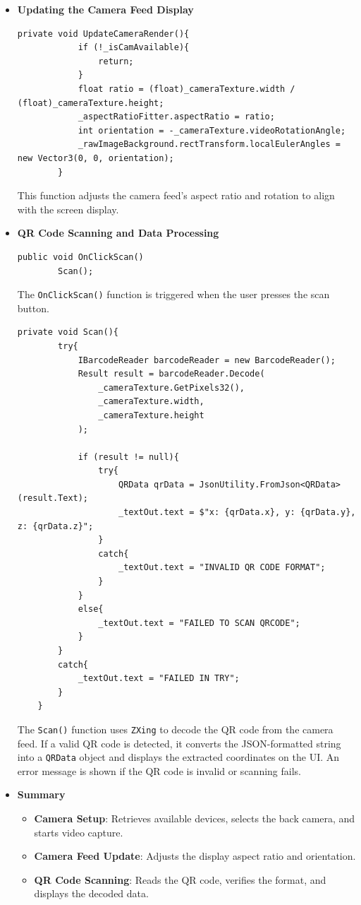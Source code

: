 \begin{itemize}
    \item \textbf{Updating the Camera Feed Display}
        \begin{lstlisting}[style=cSharp]
        private void UpdateCameraRender(){
            if (!_isCamAvailable){
                return;
            }
            float ratio = (float)_cameraTexture.width / (float)_cameraTexture.height;
            _aspectRatioFitter.aspectRatio = ratio;
            int orientation = -_cameraTexture.videoRotationAngle;
            _rawImageBackground.rectTransform.localEulerAngles = new Vector3(0, 0, orientation);
        }
        \end{lstlisting}
        This function adjusts the camera feed's aspect ratio and rotation to align with the screen display.

    \item \textbf{QR Code Scanning and Data Processing}
    \begin{lstlisting}[style=cSharp]
    public void OnClickScan()
        Scan();
    \end{lstlisting}
    The \texttt{OnClickScan()} function is triggered when the user presses the scan button.

    \begin{lstlisting}[style=cSharp]
    private void Scan(){
        try{
            IBarcodeReader barcodeReader = new BarcodeReader();
            Result result = barcodeReader.Decode(
                _cameraTexture.GetPixels32(), 
                _cameraTexture.width, 
                _cameraTexture.height
            );
    
            if (result != null){
                try{
                    QRData qrData = JsonUtility.FromJson<QRData>(result.Text);
                    _textOut.text = $"x: {qrData.x}, y: {qrData.y}, z: {qrData.z}";
                }
                catch{
                    _textOut.text = "INVALID QR CODE FORMAT";
                }
            }
            else{
                _textOut.text = "FAILED TO SCAN QRCODE";
            }
        }
        catch{
            _textOut.text = "FAILED IN TRY";
        }
    }
    \end{lstlisting}
    The \texttt{Scan()} function uses \texttt{ZXing} to decode the QR code from the camera feed. If a valid QR code is detected, it converts the JSON-formatted string into a \texttt{QRData} object and displays the extracted coordinates on the UI. An error message is shown if the QR code is invalid or scanning fails.

    \item \textbf{Summary}
        \begin{itemize}
            \item \textbf{Camera Setup}: Retrieves available devices, selects the back camera, and starts video capture.
            \item \textbf{Camera Feed Update}: Adjusts the display aspect ratio and orientation.
            \item \textbf{QR Code Scanning}: Reads the QR code, verifies the format, and displays the decoded data.
        \end{itemize}
\end{itemize}

